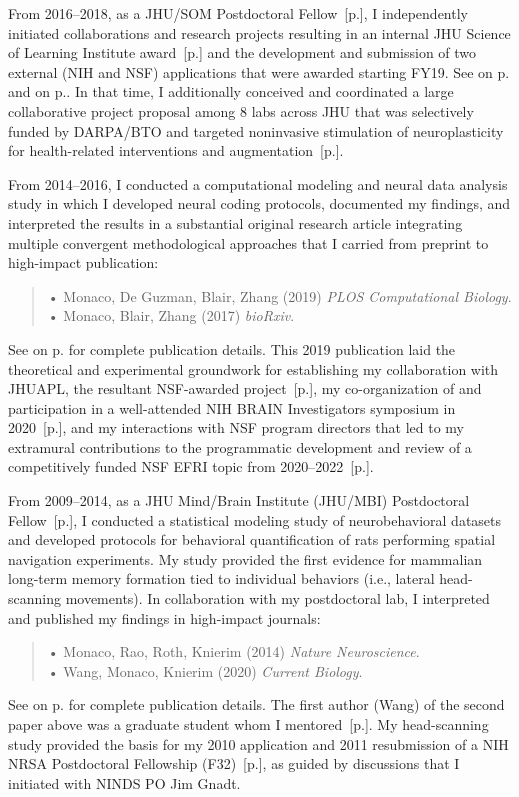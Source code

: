\documentclass[10pt]{article}
\newcommand{\see}[1]{[\textcolor{hopkinsblue}{p.\pageref{sec:#1}}]}
\newcommand{\cf}[1]{\textcolor{hopkinsblue}{See \emph{\nameref{sec:#1}} on p.\pageref{sec:#1}}}
\newcommand{\cfcf}[2]{\textcolor{hopkinsblue}{See \emph{\nameref{sec:#1}} on
  p.\pageref{sec:#1} and \emph{\nameref{sec:#2}} on p.\pageref{sec:#2}}}
\begin{document}
From 2016--2018, as a JHU/SOM Postdoctoral Fellow~\see{job2}, I independently
initiated collaborations and research projects resulting in an internal
JHU Science of Learning Institute award~\see{previnternalsupport} and the
development and submission of two external (NIH and NSF) applications that
were awarded starting FY19. \cfcf{funding}{resprogram}. In that time, I
additionally conceived and coordinated a large collaborative project proposal
among 8 labs across JHU that was selectively funded by DARPA/BTO and targeted
noninvasive stimulation of neuroplasticity for health-related interventions and
augmentation~\see{genc}.

From 2014--2016, I conducted a computational modeling and neural data analysis
study in which I developed neural coding protocols, documented my findings, and
interpreted the results in a substantial original research article integrating
multiple convergent methodological approaches that I carried from preprint to
high-impact publication:

\begin{quote}
  • Monaco, De Guzman, Blair, Zhang (2019) \emph{PLOS Computational Biology}. \\ 
  • Monaco, Blair, Zhang (2017) \emph{bioRxiv}. \\ 
\end{quote}
%
\cf{pubs} for complete publication details. This 2019 publication laid the
theoretical and experimental groundwork for establishing my collaboration with
JHUAPL, the resultant NSF-awarded project~\see{funding}, my co-organization
of and participation in a well-attended NIH BRAIN Investigators symposium in
2020~\see{symposium}, and my interactions with NSF program directors that led
to my extramural contributions to the programmatic development and review of a
competitively funded NSF EFRI topic from 2020--2022~\see{programsvc}.

From 2009--2014, as a JHU Mind/Brain Institute (JHU/MBI) Postdoctoral
Fellow~\see{job3}, I conducted a statistical modeling study of neurobehavioral
datasets and developed protocols for behavioral quantification of rats
performing spatial navigation experiments. My study provided the first evidence
for mammalian long-term memory formation tied to individual behaviors (i.e.,
lateral head-scanning movements). In collaboration with my postdoctoral lab, I
interpreted and published my findings in high-impact journals:

\begin{quote}
  • Monaco, Rao, Roth, Knierim (2014) \emph{Nature Neuroscience}. \\ 
  • Wang, Monaco, Knierim (2020) \emph{Current Biology}. \\ 
\end{quote}
%
\cf{pubs} for complete publication details. The first author (Wang) of the
second paper above was a graduate student whom I mentored~\see{mentoring}.
My head-scanning study provided the basis for my 2010 application and 2011
resubmission of a NIH NRSA Postdoctoral Fellowship (F32)~\see{nrsa}, as guided
by discussions that I initiated with NINDS PO Jim Gnadt.
\end{document}
